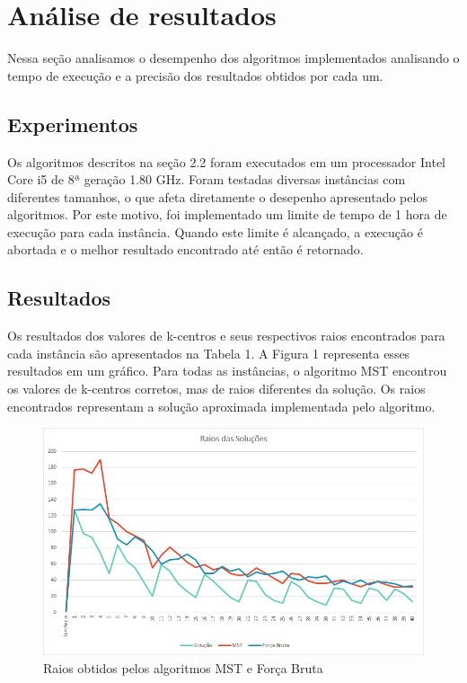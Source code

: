 \section{\esp Análise de resultados}
Nessa seção analisamos o desempenho dos algoritmos implementados analisando o tempo de execução e a precisão dos resultados obtidos por cada um. 

\subsection{\esp Experimentos}
Os algoritmos descritos na seção 2.2 foram executados em um processador Intel Core i5 de 8ª geração 1.80 GHz. Foram testadas diversas instâncias com diferentes tamanhos, o que afeta diretamente o desepenho apresentado pelos algoritmos. Por este motivo, foi implementado um limite de tempo de 1 hora de execução para cada instância. Quando este limite é alcançado, a execução é abortada e o melhor resultado encontrado até então é retornado. 

\subsection{\esp Resultados}
Os resultados dos valores de k-centros e seus respectivos raios encontrados para cada instância são apresentados na Tabela 1. A Figura 1 representa esses resultados em um gráfico. Para todas as instâncias, o algoritmo MST encontrou os valores de k-centros corretos, mas de raios diferentes da solução. Os raios encontrados representam a solução aproximada implementada pelo algoritmo. 

\begin{figure}[h]
  \centering
  \includegraphics[width=1.0\textwidth]{figuras/raios.jpg}
  \caption{Raios obtidos pelos algoritmos MST e Força Bruta}
  \label{fig:raios}
\end{figure}

